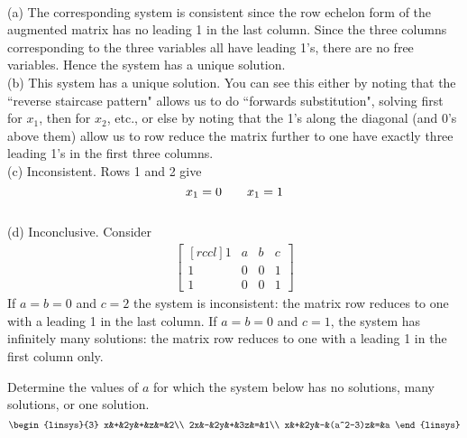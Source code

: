 \ee
\begin{solution}\ \\
(a) The corresponding system is consistent since the row echelon form of the augmented matrix has no leading 1 in the last column. Since the three columns corresponding to the three variables all have leading 1's, there are no free variables. Hence the system has a unique solution. 
\\
(b) This system has a unique solution. You can see this either by noting that the ``reverse staircase pattern" allows us to do ``forwards substitution", solving first for $x_1$, then for $x_2$, etc., or else by noting that the 1's along the diagonal (and 0's above them) allow us to row reduce the matrix further to one have exactly three leading 1's in the first three columns.  
\\
(c)
Inconsistent. Rows 1 and 2 give
$$ x_1 = 0 \hspace{7mm} x_1 = 1$$
\\
(d)
Inconclusive. Consider
\begin{eqnarray*}
\begin{bmatrix}[rccl]
1&a&b&c\\
1&0&0&1\\
1&0&0&1
\end{bmatrix}
\end{eqnarray*}
If $a=b=0$ and $c=2$ the system is inconsistent: the matrix row reduces to one with a leading 1 in the last column.  If $a = b = 0$ and $c=1$, the system has infinitely many solutions: the matrix row reduces to one with a leading 1 in the first column only.  
\end{solution}
\ii
Determine the values of $a$ for which the system below has  no solutions, many solutions, or one solution.
\[
\begin{linsys}{3}
x&+&2y&+&z&=&2\\
2x&-&2y&+&3z&=&1\\
x&+&2y&-&(a^2-3)z&=&a
\end{linsys}
\]
\\
